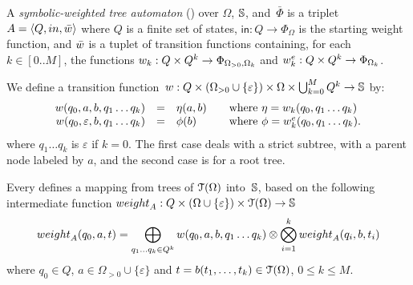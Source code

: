 %
\begin{definition}  \label{def:SWTA}
A \emph{symbolic-weighted tree automaton} (\SWTA)
over $\Omega$, $\mathbb{S}$, and~$\bar\Phi$
is a triplet $A = \< Q, \init, \bar{\wei} >$ where
$Q$ is a finite set of states, 
$\mathsf{in} : Q \to \Phi_\Omega$ is the starting weight function, 
and $\bar{\wei}$ is a tuplet of transition functions containing, 
for each $k \in [0..M]$, 
the functions $\wei_{k}: Q \times Q^{k} \to \Phi_{\Omega_{>0},\Omega_k}$
and $\weie[k]: Q \times Q^{k} \to \Phi_{\Omega_k}$.
\end{definition}
%
We define %
a transition 
function~$\wei: Q \times (\Omega_{> 0} \cup \{ \varepsilon \}) \times \Omega \times \bigcup_{k=0}^{M} Q^k 
  \to \Semiring$
by: %
\[
\begin{array}{rcll}
\wei(q_0, a, b, q_1 \ldots q_k) & = & \eta(a, b) &
\quad\mathrm{where~} \eta = \wei_{k}(q_0, q_1\ldots q_k)\\
\wei(q_0, \varepsilon, b, q_1 \ldots q_k) & = & \phi(b) &
\quad\mathrm{where~} \phi = \weie[k](q_0, q_1\ldots q_k).
\end{array}      
\]
%
\noindent
where $q_1\ldots q_k$ is $\varepsilon$ if $k = 0$.
The first case deals with a strict subtree, with a parent node labeled by $a$, 
and the second case is for a root tree.

\noindent
Every \SWTA %
defines a mapping 
from trees of $\mathcal{T}(\Omega)$ into~$\mathbb{S}$, %
based on the following intermediate function
$\weight_A: Q \times (\Omega \cup \{ \varepsilon \}) \times \T(\Omega) \to \Semiring$ 
\begin{equation}
\weight_A(q_0, a, t) =  %
 \displaystyle\bigoplus_{q_1 \ldots q_k \in Q^k} %
              \wei(q_0, a, b, q_1 \ldots q_k ) 
   \otimes \displaystyle\bigotimes_{i=1}^{k}
           \weight_A(q_i, b, t_i)
\end{equation}
where $q_0 \in Q$, $a \in \Omega_{>0} \cup \{ \varepsilon \}$ and 
$t = b(t_1,\ldots, t_k) \in \mathcal{T}(\Omega)$,
$0 \leq k \leq M$.

